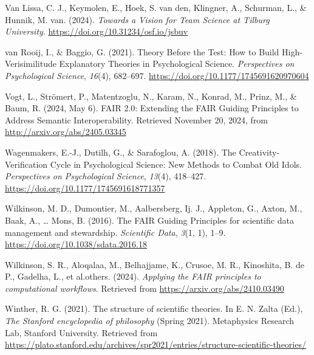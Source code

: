 \documentclass[
  man, noextraspace,floatsintext]{apa6}
\newlength{\cslhangindent}
\newenvironment{CSLReferences}[2] %
 {\begin{list}{}{%
  \setlength{\itemindent}{0pt}
  \setlength{\leftmargin}{0pt}
  \setlength{\parsep}{0pt}
  \ifodd #1
   \setlength{\leftmargin}{\cslhangindent}
   \setlength{\itemindent}{-1\cslhangindent}
  \fi
  \setlength{\itemsep}{#2\baselineskip}}}
 {\end{list}}
\begin{document}
\begin{CSLReferences}{1}{0}
Van Lissa, C. J., Keymolen, E., Hoek, S. van den, Klingner, A., Schurman, L., \& Hunnik, M. van. (2024). \emph{Towards a {Vision} for {Team Science} at {Tilburg University}}. \url{https://doi.org/10.31234/osf.io/jsbuv}

van Rooij, I., \& Baggio, G. (2021). Theory {Before} the {Test}: {How} to {Build High-Verisimilitude Explanatory Theories} in {Psychological Science}. \emph{Perspectives on Psychological Science}, \emph{16}(4), 682--697. \url{https://doi.org/10.1177/1745691620970604}

Vogt, L., Strömert, P., Matentzoglu, N., Karam, N., Konrad, M., Prinz, M., \& Baum, R. (2024, May 6). {FAIR} 2.0: {Extending} the {FAIR Guiding Principles} to {Address Semantic Interoperability}. Retrieved November 20, 2024, from \url{http://arxiv.org/abs/2405.03345}

Wagenmakers, E.-J., Dutilh, G., \& Sarafoglou, A. (2018). The {Creativity-Verification Cycle} in {Psychological Science}: {New Methods} to {Combat Old Idols}. \emph{Perspectives on Psychological Science}, \emph{13}(4), 418--427. \url{https://doi.org/10.1177/1745691618771357}

Wilkinson, M. D., Dumontier, M., Aalbersberg, Ij. J., Appleton, G., Axton, M., Baak, A., \ldots{} Mons, B. (2016). The {FAIR Guiding Principles} for scientific data management and stewardship. \emph{Scientific Data}, \emph{3}(1, 1), 1--9. \url{https://doi.org/10.1038/sdata.2016.18}

Wilkinson, S. R., Aloqalaa, M., Belhajjame, K., Crusoe, M. R., Kinoshita, B. de P., Gadelha, L., et al.others. (2024). \emph{Applying the {FAIR} principles to computational workflows}. Retrieved from \url{https://arxiv.org/abs/2410.03490}

Winther, R. G. (2021). The structure of scientific theories. In E. N. Zalta (Ed.), \emph{The {Stanford} encyclopedia of philosophy} (Spring 2021). Metaphysics Research Lab, Stanford University. Retrieved from \url{https://plato.stanford.edu/archives/spr2021/entries/structure-scientific-theories/}

\end{CSLReferences}
\end{document}
